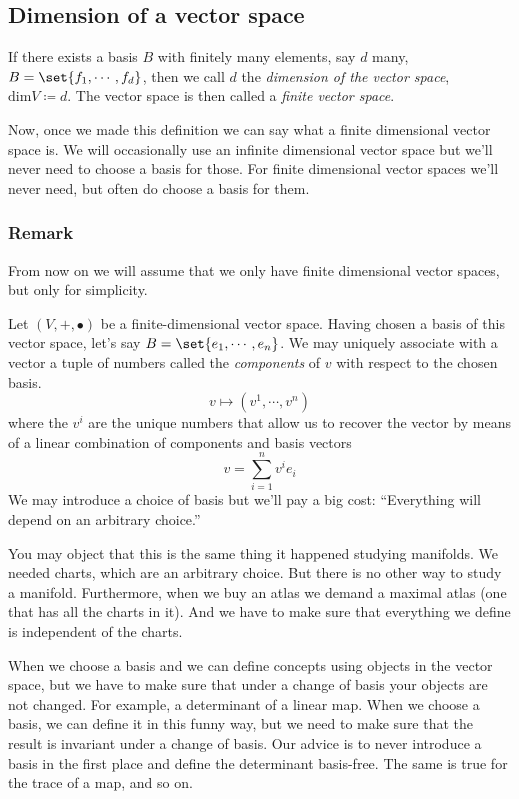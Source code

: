 \subsection{Dimension of a vector space}
If there exists a basis $B$ with finitely many elements, say $d$ many, $B = \set{f_1,\cdots,f_d}$,
then we call $d$ the \emph{dimension of the vector space}, $\text{dim} V \coloneq d$. The vector
space is then called a \emph{finite vector space}.

Now, once we made this definition we can say what a finite dimensional vector space is.
We will occasionally use an infinite dimensional vector space but we'll never need to choose a basis
for those. For finite dimensional vector spaces we'll never need, but often do choose a basis for
them.

\subsubsection{Remark}
From now on we will assume that we only have finite dimensional vector spaces,
but only for simplicity.

Let $(V,+,\vysmblkcircle)$ be a finite-dimensional vector space. Having chosen a basis of this
vector space, let's say $B = \set{e_1,\cdots,e_n}$. We may uniquely associate with a vector
a tuple of numbers called the \emph{components} of $v$ with respect to the chosen basis\footnotemark{}.
\[
  v \longmapsto (v^1, \cdots, v^n)
\]
where the $v^i$ are the unique numbers that allow us to recover the vector by means of a linear
combination of components and basis vectors
\[
  v = \sum_{i=1}^n v^i e_i
\]
We may introduce a choice of basis but we'll pay a big cost:
``Everything will depend on an arbitrary choice.''

You may object that this is the same thing it happened studying manifolds. We needed charts, which
are an arbitrary choice. But there is no other way to study a manifold. Furthermore, when we buy an
atlas we demand a maximal atlas (one that has all the charts in it). And we have to make sure that
everything we define is independent of the charts.

When we choose a basis and we can define concepts using objects in the vector space, but we have to
make sure that under a change of basis your objects are not changed.
For example, a determinant of a linear map. When we choose a basis, we can define it in this funny
way, but we need to make sure that the result is invariant under a change of basis.
Our advice is to never introduce a basis in the first place and define the determinant basis-free.
The same is true for the trace of a map, and so on.

